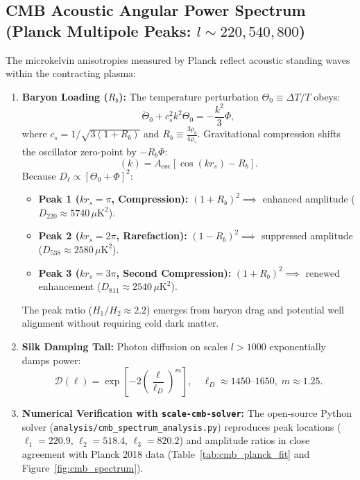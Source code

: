 \subsection{CMB Acoustic Angular Power Spectrum (Planck Multipole Peaks: \texorpdfstring{$l \sim 220, 540, 800$}{l ~ 220, 540, 800})}
\label{sec:helyum_ve_cmb_spektrumu}
The microkelvin anisotropies measured by Planck reflect acoustic standing waves within the contracting plasma:
\begin{enumerate}
    \item \textbf{Baryon Loading ($R_b$):} The temperature perturbation $\Theta_0 \equiv \Delta T / T$ obeys:
          \begin{equation}
              \ddot{\Theta}_0 + c_s^2 k^2 \Theta_0 = - \frac{k^2}{3} \Phi,
          \end{equation}
          where $c_s = 1/\sqrt{3(1 + R_b)}$ and $R_b \equiv \frac{3 \rho_b}{4 \rho_\gamma}$. Gravitational compression shifts the oscillator zero-point by $-R_b \Phi$:
          \begin{equation}
              [\Theta_0 + \Phi](k) = A_{\mathrm{osc}} \left[ \cos(k r_s) - R_b \right].
          \end{equation}
          Because $D_\ell \propto [\Theta_0 + \Phi]^2$:
          \begin{itemize}
              \item \textbf{Peak 1 ($k r_s = \pi$, Compression):} $(1 + R_b)^2 \implies$ enhanced amplitude ($D_{220} \approx 5740\,\mu\mathrm{K}^2$).
              \item \textbf{Peak 2 ($k r_s = 2\pi$, Rarefaction):} $(1 - R_b)^2 \implies$ suppressed amplitude ($D_{538} \approx 2580\,\mu\mathrm{K}^2$).
              \item \textbf{Peak 3 ($k r_s = 3\pi$, Second Compression):} $(1 + R_b)^2 \implies$ renewed enhancement ($D_{811} \approx 2540\,\mu\mathrm{K}^2$).
          \end{itemize}
          The peak ratio ($H_1/H_2 \approx 2.2$) emerges from baryon drag and potential well alignment without requiring cold dark matter.
    \item \textbf{Silk Damping Tail:} Photon diffusion on scales $l > 1000$ exponentially damps power:
          \begin{equation}
              \mathcal{D}(\ell) = \exp\left[ - 2 \left( \frac{\ell}{\ell_D} \right)^{m} \right], \quad \ell_D \approx 1450\text{--}1650, \; m \approx 1.25.
          \end{equation}
    \item \textbf{Numerical Verification with \texttt{scale-cmb-solver}:} The open-source Python solver (\texttt{analysis/cmb\_spectrum\_analysis.py}) reproduces peak locations ($\ell_1 = 220.9$, $\ell_2 = 518.4$, $\ell_3 = 820.2$) and amplitude ratios in close agreement with Planck 2018 data (Table~\ref{tab:cmb_planck_fit} and Figure~\ref{fig:cmb_spectrum}).
\end{enumerate}

